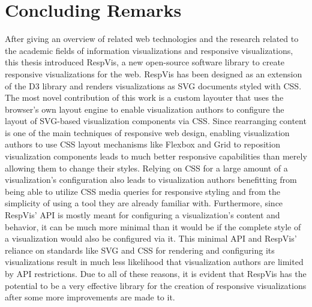 \chapter{Concluding Remarks}
\label{chap:Concl}

After giving an overview of related web technologies and the research
related to the academic fields of information visualizations and
responsive visualizations, this thesis introduced RespVis, a new
open-source software library to create responsive visualizations for
the web.  RespVis has been designed as an extension of the D3 library
and renders visualizations as SVG documents styled with CSS.  The most
novel contribution of this work is a custom layouter that uses the
browser's own layout engine to enable visualization authors to
configure the layout of SVG-based visualization components via CSS.
Since rearranging content is one of the main techniques of responsive
web design, enabling visualization authors to use CSS layout
mechanisms like Flexbox and Grid to reposition visualization
components leads to much better responsive capabilities than merely
allowing them to change their styles.  Relying on CSS for a large
amount of a visualization's configuration also leads to visualization
authors benefitting from being able to utilize CSS media queries for
responsive styling and from the simplicity of using a tool they are
already familiar with.  Furthermore, since RespVis' API is mostly
meant for configuring a visualization's content and behavior, it can
be much more minimal than it would be if the complete style of a
visualization would also be configured via it.  This minimal API and
RespVis' reliance on standards like SVG and CSS for rendering and
configuring its visualizations result in much less likelihood that
visualization authors are limited by API restrictions.  Due to all of
these reasons, it is evident that RespVis has the potential to be a
very effective library for the creation of responsive visualizations
after some more improvements are made to it.
